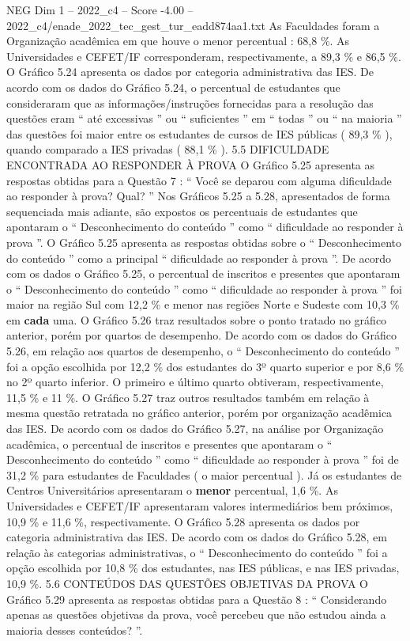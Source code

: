 \begin{textsample}{NEG Dim 1 – 2022\_c4 – Score -4.00 – 2022\_c4/enade\_2022\_tec\_gest\_tur\_eadd874aa1.txt}
As Faculdades foram a Organização acadêmica em que houve o menor percentual : 68,8 \%.
As Universidades e CEFET/IF corresponderam, respectivamente, a 89,3 \% e 86,5 \%.
O Gráfico 5.24 apresenta os dados por categoria administrativa das IES.
De acordo com os dados do Gráfico 5.24, o percentual de estudantes que consideraram que as informações/instruções fornecidas para a resolução das questões eram “ até excessivas ” ou “ suficientes ” em “ todas ” ou “ na maioria ” das questões foi maior entre os estudantes de cursos de IES públicas ( 89,3 \% ), quando comparado a IES privadas ( 88,1 \% ). 5.5 DIFICULDADE ENCONTRADA AO RESPONDER À PROVA O Gráfico 5.25 apresenta as respostas obtidas para a Questão 7 : “ Você se deparou com alguma dificuldade ao responder à prova?
Qual? ” Nos Gráficos 5.25 a 5.28, apresentados de forma sequenciada mais adiante, são expostos os percentuais de estudantes que apontaram o “ Desconhecimento do conteúdo ” como “ dificuldade ao responder à prova ”.
O Gráfico 5.25 apresenta as respostas obtidas sobre o “ Desconhecimento do conteúdo ” como a principal “ dificuldade ao responder à prova ”.
De acordo com os dados o Gráfico 5.25, o percentual de inscritos e presentes que apontaram o “ Desconhecimento do conteúdo ” como “ dificuldade ao responder à prova ” foi maior na região Sul com 12,2 \% e menor nas regiões Norte e Sudeste com 10,3 \% em \textbf{cada} uma.
O Gráfico 5.26 traz resultados sobre o ponto tratado no gráfico anterior, porém por quartos de desempenho.
De acordo com os dados do Gráfico 5.26, em relação aos quartos de desempenho, o “ Desconhecimento do conteúdo ” foi a opção escolhida por 12,2 \% dos estudantes do 3º quarto superior e por 8,6 \% no 2º quarto inferior.
O primeiro e último quarto obtiveram, respectivamente, 11,5 \% e 11 \%.
O Gráfico 5.27 traz outros resultados também em relação à mesma questão retratada no gráfico anterior, porém por organização acadêmica das IES.
De acordo com os dados do Gráfico 5.27, na análise por Organização acadêmica, o percentual de inscritos e presentes que apontaram o “ Desconhecimento do conteúdo ” como “ dificuldade ao responder à prova ” foi de 31,2 \% para estudantes de Faculdades ( o maior percentual ).
Já os estudantes de Centros Universitários apresentaram o \textbf{menor} percentual, 1,6 \%.
As Universidades e CEFET/IF apresentaram valores intermediários bem próximos, 10,9 \% e 11,6 \%, respectivamente.
O Gráfico 5.28 apresenta os dados por categoria administrativa das IES.
De acordo com os dados do Gráfico 5.28, em relação às categorias administrativas, o “ Desconhecimento do conteúdo ” foi a opção escolhida por 10,8 \% dos estudantes, nas IES públicas, e nas IES privadas, 10,9 \%. 5.6 CONTEÚDOS DAS QUESTÕES OBJETIVAS DA PROVA O Gráfico 5.29 apresenta as respostas obtidas para a Questão 8 : “ Considerando apenas as questões objetivas da prova, você percebeu que não estudou ainda a maioria desses conteúdos? ”.

\end{textsample}
